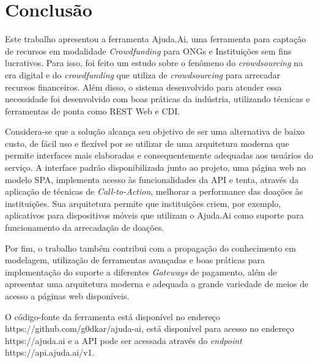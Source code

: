 \chapter{Conclusão}

Este trabalho apresentou a ferramenta Ajuda.Ai, uma ferramenta para captação de recursos em modalidade \emph{Crowdfunding} para ONGs e Instituições sem fins lucrativos. Para isso, foi feito um estudo sobre o fenômeno do \emph{crowdsourcing} na era digital e do \emph{crowdfunding} que utiliza de \emph{crowdsourcing} para arrecadar recursos financeiros. Além disso, o sistema desenvolvido para atender essa necessidade foi desenvolvido com boas práticas da indústria, utilizando técnicas e ferramentas de ponta como REST Web e CDI.

Considera-se que a solução alcança seu objetivo de ser uma alternativa de baixo custo, de fácil uso e flexível por se utilizar de uma arquitetura moderna que permite interfaces mais elaboradas e consequentemente adequadas aos usuários do serviço. A interface padrão disponibilizada junto ao projeto, uma página web no modelo SPA, implementa acesso às funcionalidades da API e tenta, através da aplicação de técnicas de \emph{Call-to-Action}, melhorar a performance das doações às instituições. Sua arquitetura permite que instituições criem, por exemplo, aplicativos para dispositivos móveis que utilizam o Ajuda.Ai como suporte para funcionamento da arrecadação de doações.

Por fim, o trabalho também contribui com a propagação do conhecimento em modelagem, utilização de ferramentas avançadas e boas práticas para implementação do suporte a diferentes \emph{Gateways} de pagamento, além de apresentar uma arquitetura moderna e adequada a grande variedade de meios de acesso a páginas web disponíveis.

O código-fonte da ferramenta está disponível no endereço https://github.com/g0dkar/ajuda-ai, está disponível para acesso no endereço https://ajuda.ai e a API pode ser acessada através do \emph{endpoint} https://api.ajuda.ai/v1.